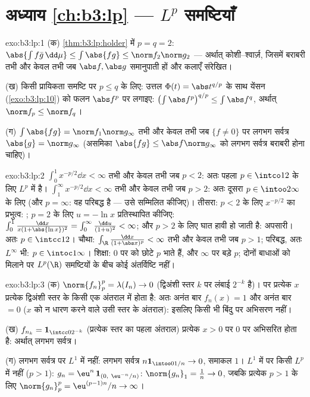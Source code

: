 \section*{अध्याय \ref{ch:b3:lp} --- $L^p$ समष्टियाँ}

\begin{solution}{exo:b3:lp:1}
(क) \cref{thm:b3:lp:holder} में $p = q = 2$: $\abs{\int f\bar
g\,\dd\mu} \leq \int\abs{fg} \leq \norm f_2\norm g_2$ --- अर्थात् कोशी--श्वार्ज़, जिसमें बराबरी तभी
और केवल तभी जब $\abs f, \abs g$ समानुपाती हों और कलाएँ संरेखित।

(ख) किसी प्रायिकता समष्टि पर $p \leq q$ के लिए: उत्तल $\Phi(t) =
\abs t^{q/p}$ के साथ येंसन
(\cref{exo:b3:lp:10}) को फलन $\abs f^p$ पर लगाइए: $\bigl(\int\abs f^p\bigr)^{q/p} \leq \int\abs f^q$, अर्थात् $\norm f_p \leq \norm f_q$।

(ग) $\int\abs{fg} = \norm f_1\norm g_\infty$ तभी और केवल तभी जब $\{f \neq 0\}$ पर लगभग सर्वत्र $\abs{g} =
\norm g_\infty$ (असमिका $\abs{fg} \leq \abs f\norm g_\infty$
को लगभग सर्वत्र बराबरी होना चाहिए)।
\end{solution}

\begin{solution}{exo:b3:lp:2}
$\int_0^1 x^{-p/2}\dd x < \infty$ तभी और केवल तभी जब $p < 2$: अतः पहला $p \in \intco12$ के लिए $L^p$ में है।
$\int_1^\infty x^{-p/2}\dd x <
\infty$ तभी और केवल तभी जब $p > 2$: अतः दूसरा $p \in \intoo2\infty$ के लिए (और $p = \infty$: वह
परिबद्ध है --- उसे सम्मिलित कीजिए)। तीसरा: $p <
2$ के लिए $x^{-p/2}$ का
प्रभुत्व: ; $p = 2$ के लिए $u = -\ln x$ प्रतिस्थापित कीजिए: $\int_0^1\frac{\dd x}{x(1 + \abs{\ln
x})^2} = \int_0^\infty\frac{\dd u}{(1 + u)^2} < \infty$; और
$p > 2$ के लिए घात हावी हो जाती है: अपसारी। अतः $p \in \intcc12$। चौथा: $\int_\R\frac{\dd x}{(1 + \abs x)^p} < \infty$ तभी
और केवल तभी जब $p >
1$; परिबद्ध, अतः $L^\infty$ भी: $p \in
\intoc1\infty$। शिक्षा: $0$ पर
 को छोटे $p$ भाते हैं, और $\infty$ पर बड़े $p$; दोनों बाधाओं
को मिलाने पर $L^p(\R)$ समष्टियों के बीच कोई अंतर्विष्टि नहीं।
\end{solution}

\begin{solution}{exo:b3:lp:3}
(क) $\norm{f_n}_p^p = \lambda(I_n) \to 0$ (द्विअंशी स्तर $k$ पर लंबाई $2^{-k}$ है)। पर प्रत्येक $x$
प्रत्येक द्विअंशी स्तर के किसी एक अंतराल में होता है: अतः अनंत बार
$f_n(x) = 1$ और अनंत बार $= 0$ ($x$ को न धारण करने वाले उसी स्तर के अंतराल):
इसलिए किसी भी बिंदु पर अभिसरण नहीं।

(ख) $f_{n_k} = \mathbf 1_{\intcc0{2^{-k}}}$ (प्रत्येक स्तर का पहला अंतराल) प्रत्येक $x > 0$ पर $0$ पर
अभिसरित होता है: अर्थात् लगभग सर्वत्र।

(ग) लगभग सर्वत्र पर $L^1$ में नहीं: लगभग सर्वत्र $n\mathbf 1_{\intoo0{1/n}} \to 0$, समाकल $1$।
$L^1$ में पर किसी $L^p$ में नहीं ($p > 1$): $g_n =
\eu^n\,\mathbf 1_{(0,\ \eu^{-n}/n)}$: $\norm{g_n}_1 = \frac1n
\to 0$, जबकि प्रत्येक
$p > 1$ के लिए $\norm{g_n}_p^p = \eu^{(p-1)n}/n \to \infty$।
\end{solution}

